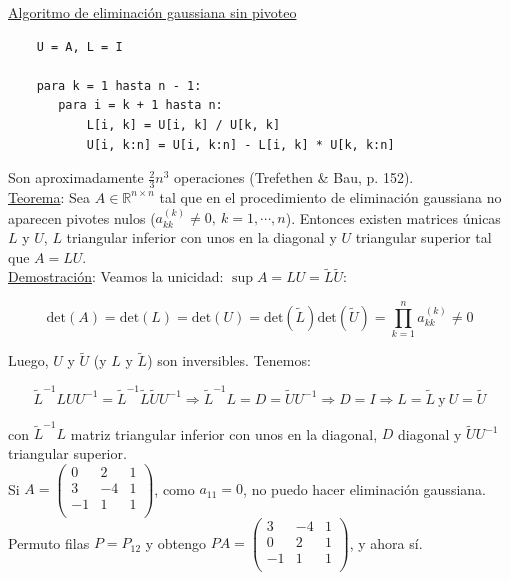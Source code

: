 \underline{Algoritmo de eliminaci\'on gaussiana sin pivoteo}\\

\begin{verbatim}
    U = A, L = I

    para k = 1 hasta n - 1:
       para i = k + 1 hasta n:
           L[i, k] = U[i, k] / U[k, k]
           U[i, k:n] = U[i, k:n] - L[i, k] * U[k, k:n]
\end{verbatim}

Son aproximadamente $\frac{2}{3}n^{3}$ operaciones (Trefethen \& Bau, p. 152).\\

\underline{Teorema}: Sea $A \in \mathbb{R}^{n \times n}$ tal que en el procedimiento de eliminaci\'on gaussiana no aparecen pivotes nulos ($a_{kk}^{(k)} \neq 0,\ k = 1, \cdots, n$). Entonces existen matrices \'unicas $L$ y $U$, $L$ triangular inferior con unos en la diagonal y $U$ triangular superior tal que $A = LU$.\\

\underline{Demostraci\'on}: Veamos la unicidad: $\sup A = LU = \tilde{L}\tilde{U}$:

$$\text{det}(A) = \text{det}(L) = \text{det}(U) = \text{det}(\tilde{L})\text{det}(\tilde{U}) = \prod \limits_{k = 1}^{n} a_{kk}^{(k)} \neq 0$$

Luego, $U$ y $\tilde{U}$ (y $L$ y $\tilde{L}$) son inversibles. Tenemos:

$$\tilde{L}^{-1}LUU^{-1} = \tilde{L}^{-1}\tilde{L}\tilde{U}U^{-1} \Rightarrow \tilde{L}^{-1}L = D = \tilde{U}U^{-1} \Rightarrow D = I \Rightarrow L = \tilde{L}\ \text{y}\ U = \tilde{U}$$

con $\tilde{L}^{-1}L$ matriz triangular inferior con unos en la diagonal, $D$ diagonal y $\tilde{U}U^{-1}$ triangular superior.\\

Si $ A =
	\begin{pmatrix}
        0 & 2 & 1\\
        3 & -4 & 1\\
        -1 & 1 & 1\\
	\end{pmatrix}
$, como $a_{11} = 0$, no puedo hacer eliminaci\'on gaussiana. Permuto filas $P = P_{12}$ y obtengo $ PA =
	\begin{pmatrix}
        3 & -4 & 1\\
        0 & 2 & 1\\
        -1 & 1 & 1\\
	\end{pmatrix}
$, y ahora s\'i.\\

